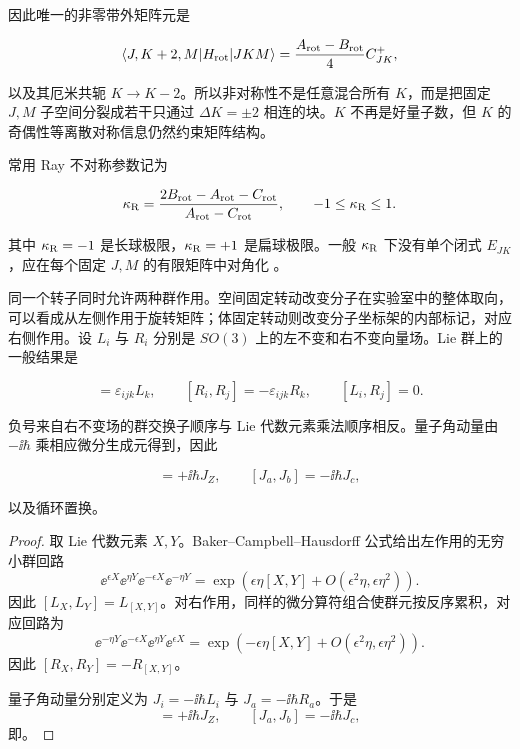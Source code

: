 因此唯一的非零带外矩阵元是

\begin{equation}
\langle J,K+2,M|H_{\rm rot}|JKM\rangle
=\frac{A_{\rm rot}-B_{\rm rot}}4 C^+_{JK},
\label{eq:asymmetric-top-offdiagonal-element}
\end{equation}

以及其厄米共轭 \(K\to K-2\)。所以非对称性不是任意混合所有 \(K\)，而是把固定 \(J,M\) 子空间分裂成若干只通过 \(\Delta K=\pm2\) 相连的块。\(K\) 不再是好量子数，但 \(K\) 的奇偶性等离散对称信息仍然约束矩阵结构。

常用 Ray 不对称参数记为

\begin{equation}
\kappa_{\rm R}
=\frac{2B_{\rm rot}-A_{\rm rot}-C_{\rm rot}}
{A_{\rm rot}-C_{\rm rot}},
\qquad -1\le\kappa_{\rm R}\le1.
\label{eq:ray-asymmetry-parameter}
\end{equation}

其中 \(\kappa_{\rm R}=-1\) 是长球极限，\(\kappa_{\rm R}=+1\) 是扁球极限。一般 \(\kappa_{\rm R}\) 下没有单个闭式 \(E_{JK}\)，应在每个固定 \(J,M\) 的有限矩阵中对角化 。

同一个转子同时允许两种群作用。空间固定转动改变分子在实验室中的整体取向，可以看成从左侧作用于旋转矩阵；体固定转动则改变分子坐标架的内部标记，对应右侧作用。设 \(L_i\) 与 \(R_i\) 分别是 \(SO(3)\) 上的左不变和右不变向量场。Lie 群上的一般结果是

\begin{equation}
[L_i,L_j]=\varepsilon_{ijk}L_k,
\qquad
[R_i,R_j]=-\varepsilon_{ijk}R_k,
\qquad
[L_i,R_j]=0.
\label{eq:left-right-invariant-algebra}
\end{equation}

负号来自右不变场的群交换子顺序与 Lie 代数元素乘法顺序相反。量子角动量由 \(-\ii\hbar\) 乘相应微分生成元得到，因此

\begin{equation}
[J_X,J_Y]=+\ii\hbar J_Z,
\qquad
[J_a,J_b]=-\ii\hbar J_c,
\label{eq:body-fixed-anomalous-commutator}
\end{equation}

以及循环置换。

\begin{proof}
取 Lie 代数元素 \(X,Y\)。Baker--Campbell--Hausdorff 公式给出左作用的无穷小群回路
\[
 \ee^{\epsilon X}\ee^{\eta Y}
 \ee^{-\epsilon X}\ee^{-\eta Y}
 =\exp\!\left(\epsilon\eta[X,Y]
 +O(\epsilon^2\eta,\epsilon\eta^2)\right).
\]
因此 \([L_X,L_Y]=L_{[X,Y]}\)。对右作用，同样的微分算符组合使群元按反序累积，对应回路为
\[
 \ee^{-\eta Y}\ee^{-\epsilon X}\ee^{\eta Y}\ee^{\epsilon X}
 =\exp\!\left(-\epsilon\eta[X,Y]+O(\epsilon^2\eta,\epsilon\eta^2)\right).
\]
因此 \([R_X,R_Y]=-R_{[X,Y]}\)。

量子角动量分别定义为
\(J_i=-\ii\hbar L_i\) 与 \(J_a=-\ii\hbar R_a\)。于是
\begin{equation*}
 [J_X,J_Y]=+\ii\hbar J_Z,\qquad
 [J_a,J_b]=-\ii\hbar J_c ,
\end{equation*}
即。
\end{proof}

